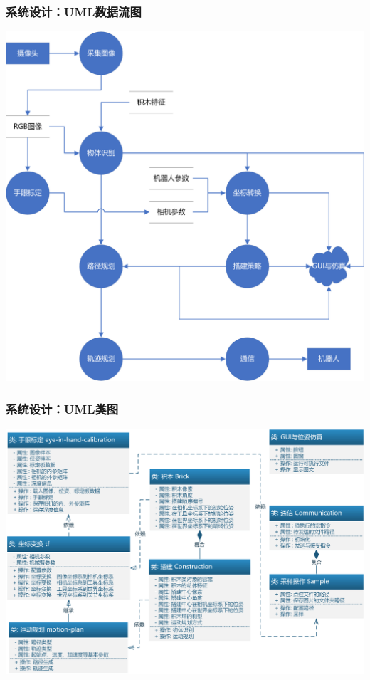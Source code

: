 \documentclass{beamer}
\begin{document}
\begin{frame}
    \frametitle{系统设计：UML数据流图}
    \centering
    \includegraphics[scale=0.42]{UML数据流图.png}
\end{frame}


\begin{frame}
    \frametitle{系统设计：UML类图}
    \centering
    \includegraphics[scale=0.4]{UML类图.png}
\end{frame}
\end{document}
